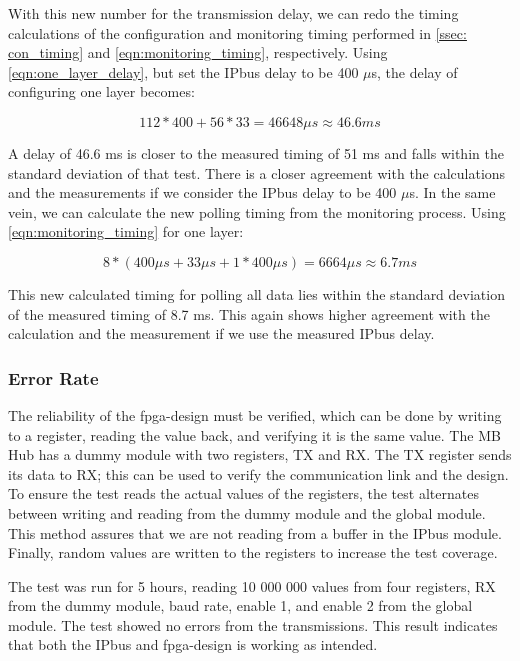 \documentclass[main.tex]{subfiles}
\begin{document}
With this new number for the transmission delay, we can redo the timing calculations of the configuration and monitoring timing performed in \autoref{ssec: con_timing} and \autoref{eqn:monitoring_timing}, respectively. Using \autoref{eqn:one_layer_delay}, but set the IPbus delay to be 400 $\mu$s, the delay of configuring one layer becomes:

\begin{equation} \label{eqn:new_one_layer_delay}
112 * 400 + 56*33 =  46648\mu s \approx 46.6 ms
\end{equation}

A delay of 46.6 ms is closer to the measured timing of 51 ms and falls within the standard deviation of that test. There is a closer agreement with the calculations and the measurements if we consider the IPbus delay to be 400 $\mu$s. In the same vein, we can calculate the new polling timing from the monitoring process. Using \autoref{eqn:monitoring_timing} for one layer:

\begin{equation} \label{eqn:new_monitoring_timing}
8*(400\mu s + 33 \mu s + 1*400\mu s) = 6664 \mu s \approx 6.7 ms
\end{equation}

This new calculated timing for polling all data lies within the standard deviation of the measured timing of 8.7 ms. This again shows higher agreement with the calculation and the measurement if we use the measured IPbus delay.



\subsubsection{Error Rate}

The reliability of the \gls{fpga}-design must be verified, which can be done by writing to a register, reading the value back, and verifying it is the same value. The MB Hub has a dummy module with two registers, TX and RX. The TX register sends its data to RX; this can be used to verify the communication link and the design. To ensure the test reads the actual values of the registers, the test alternates between writing and reading from the dummy module and the global module. This method assures that we are not reading from a buffer in the IPbus module. Finally, random values are written to the registers to increase the test coverage.

The test was run for 5 hours, reading 10 000 000 values from four registers, RX from the dummy module, baud rate, enable 1, and enable 2 from the global module. The test showed no errors from the transmissions. This result indicates that both the IPbus and \gls{fpga}-design is working as intended.
\end{document}
